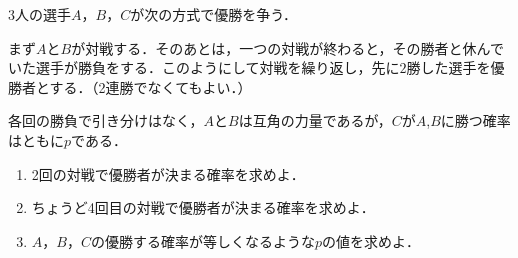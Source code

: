 \documentclass[../../main.tex]{subfiles}
\begin{document}
$3$人の選手$A$，$B$，$C$が次の方式で優勝を争う．

まず$A$と$B$が対戦する．そのあとは，一つの対戦が終わると，その勝者と休んでいた選手が勝負をする．このようにして対戦を繰り返し，先に$2$勝した選手を優勝者とする．（2連勝でなくてもよい．）

各回の勝負で引き分けはなく，$A$と$B$は互角の力量であるが，$C$が$A$,$B$に勝つ確率はともに$p$である．

\begin{enumerate}
  \item 2回の対戦で優勝者が決まる確率を求めよ．
  \item ちょうど4回目の対戦で優勝者が決まる確率を求めよ．
  \item $A$，$B$，$C$の優勝する確率が等しくなるような$p$の値を求めよ．
\end{enumerate}
\end{document}
